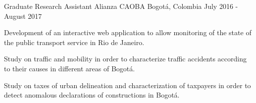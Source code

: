 \begin{cventries}
    \cventry
    {Graduate Research Assistant} %
    {Alianza CAOBA} %
    {Bogotá, Colombia} %
    {July 2016 - August 2017} %
    {
        \begin{cvitems}
        \item{Development of an interactive web application to allow monitoring of the state of the public transport service in Rio de Janeiro.}
        \item{Study on traffic and mobility in order to characterize traffic accidents according to their causes in different areas of Bogotá.}
        \item{Study on taxes of urban delineation and characterization of taxpayers in order to detect anomalous declarations of constructions in Bogotá.}
        \end{cvitems}
    } %


    \vspace{-0.5cm}
\end{cventries}
